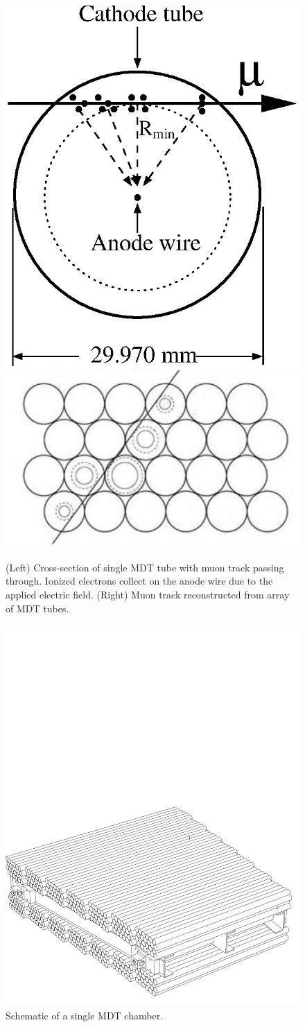\begin{figure}[ht]
\centering
\includegraphics[width=.35\textwidth]{figures/atlas/ms_mdt_tube.eps}
\includegraphics[width=.55\textwidth]{figures/atlas/ms_mdt_hits.png}
\caption{(Left) Cross-section of single MDT tube with muon track
passing through. Ionized electrons collect on the anode wire
due to the applied electric field. (Right) Muon track
reconstructed from array of MDT tubes.}
\label{fig:atlas_ms_mdt}
\end{figure}



\begin{figure}[ht]
\centering
\includegraphics[width=.8\textwidth]{figures/atlas/ms_mdt_chamber.pdf}
\caption{Schematic of a single MDT chamber.}
\label{fig:atlas_ms_mdt_chamber}
\end{figure}

